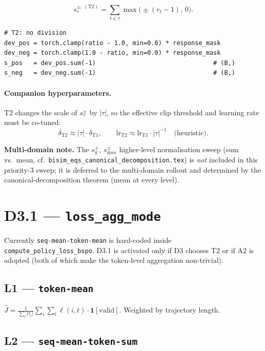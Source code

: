 \documentclass[11pt]{article}
\begin{document}
\[
s_\tau^{\pm,\,(\text{T2})}
= \sum_{t\in\tau}\max\!\bigl(\pm(r_t-1),\,0\bigr).
\]

\begin{lstlisting}
# T2: no division
dev_pos = torch.clamp(ratio - 1.0, min=0.0) * response_mask
dev_neg = torch.clamp(1.0 - ratio, min=0.0) * response_mask
s_pos   = dev_pos.sum(-1)                                # (B,)
s_neg   = dev_neg.sum(-1)                                # (B,)
\end{lstlisting}

\paragraph{Companion hyperparameters.}
T2 changes the scale of $s_\tau^\pm$ by $|\tau|$, so the effective
clip threshold and learning rate must be co-tuned:
\[
\delta_{\text{T2}} \approx |\tau|\cdot\delta_{\text{T1}},
\qquad
\text{lr}_{\text{T2}} \approx \text{lr}_{\text{T1}}\cdot|\tau|^{-1}\quad\text{(heuristic)}.
\]

\textbf{Multi-domain note.} The $s_g^\pm$, $s_{dom}^\pm$ higher-level
normalisation sweep (sum vs.\ mean, cf.\ \texttt{bisim\_eqs\_canonical\_decomposition.tex})
is \emph{not} included in this priority-3 sweep; it is deferred to the
multi-domain rollout and determined by the canonical-decomposition
theorem (mean at every level).

\section{D3.1 --- \texttt{loss\_agg\_mode}}
\label{sec:d3.1}

Currently \verb|seq-mean-token-mean| is hard-coded inside
\verb|compute_policy_loss_bspo|. D3.1 is activated only if D3 chooses T2
or if A2 is adopted (both of which make the token-level aggregation
non-trivial).

\subsection{L1 --- \texttt{token-mean}}

$\hat J = \tfrac{1}{\sum_i|\tau_i|}\sum_i\sum_t \ell(i,t)\cdot\mathbf 1[\text{valid}]$.
Weighted by trajectory length.

\subsection{L2 --- \texttt{seq-mean-token-sum}}
\end{document}
